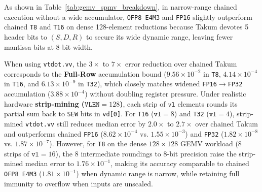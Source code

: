 As shown in Table~\ref{tab:gemv_spmv_breakdown}, in narrow-range chained execution without a wide accumulator, \texttt{OFP8 E4M3} and \texttt{FP16} slightly outperform chained \texttt{T8} and \texttt{T16} on dense 128-element reductions because Takum devotes 5 header bits to $(S, D, R)$ to secure its wide dynamic range, leaving fewer mantissa bits at 8-bit width.

When using \texttt{vtdot.vv}, the $3\times$ to $7\times$ error reduction over chained Takum corresponds to the \textbf{Full-Row} accumulation bound ($9.56 \times 10^{-2}$ in \texttt{T8}, $4.14 \times 10^{-4}$ in \texttt{T16}, and $6.13 \times 10^{-9}$ in \texttt{T32}), which closely matches widened \texttt{FP16}$\to$\texttt{FP32} accumulation ($3.88 \times 10^{-4}$) without doubling register pressure. Under realistic hardware \textbf{strip-mining ($\texttt{VLEN}=128$)}, each strip of $\texttt{vl}$ elements rounds its partial sum back to \texttt{SEW} bits in \texttt{vd[0]}. For \texttt{T16} ($\texttt{vl}=8$) and \texttt{T32} ($\texttt{vl}=4$), strip-mined \texttt{vtdot.vv} still reduces median error by $2.0\times$ to $2.7\times$ over chained Takum and outperforms chained \texttt{FP16} ($8.62 \times 10^{-4}$ vs. $1.55 \times 10^{-3}$) and \texttt{FP32} ($1.82 \times 10^{-8}$ vs. $1.87 \times 10^{-7}$). However, for \texttt{T8} on the dense $128 \times 128$ GEMV workload (8 strips of $\texttt{vl}=16$), the 8 intermediate roundings to 8-bit precision raise the strip-mined median error to $1.76 \times 10^{-1}$, making its accuracy comparable to chained \texttt{OFP8 E4M3} ($1.81 \times 10^{-1}$) when dynamic range is narrow, while retaining full immunity to overflow when inputs are unscaled.
